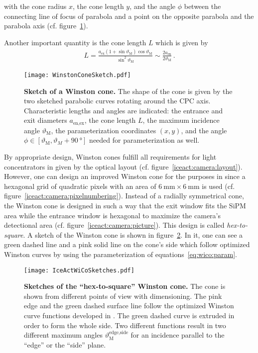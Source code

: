 with the cone radius $x$, the cone length $y$, and the angle $\phi$ between the connecting line of focus of parabola and a point on the opposite parabola and the parabola axis (cf. figure~\ref{iceact:camera:wico_sketch}).

Another important quantity is the cone length $L$ which is given by \cite{wico:book,iceact:camera}
\begin{align}
	L = \frac{a_\text{ex}(1+\sin\vartheta_\text{M})\cos\vartheta_\text{M}}{\sin^2\vartheta_\text{M}}\sim\frac{2a_\text{en}}{2\vartheta_\text{M}}\,.
\end{align}

\begin{figure}[H]
	\centering
	\texttt{[image: WinstonConeSketch.pdf]}
	\caption[Sketch of a Winston cone]{\textbf{Sketch of a Winston cone.} \cite{iceact:camera} The shape of the cone is given by the two sketched parabolic curves rotating around the CPC axis. Characteristic lengths and angles are indicated: the entrance and exit diameters $a_\text{en,ex}$, the cone length $L$, the maximum incidence angle $\vartheta_\text{M}$, the parameterization coordinates $(x,y)$, and the angle $\phi\in[\vartheta_\text{M},\vartheta_M+\SI{90}{\degree}]$ needed for parameterization as well.}
	\label{iceact:camera:wico_sketch}	
\end{figure}

By appropriate design, Winston cones fulfill all requirements for light concentrators in \iceact given by the optical layout (cf. figure~\ref{iceact:camera:layout}).
However, one can design an improved Winston cone for the purposes in \iceact since a hexagonal grid of quadratic pixels with an area of $\SI{6}{\milli\meter}\times\SI{6}{\milli\meter}$ is used (cf. figure~\ref{iceact:camera:pixelnumbering}). Instead of a radially symmetrical cone, the \iceact Winston cone is designed in such a way that the exit window fits the SiPM area while the entrance window is hexagonal to maximize the camera's detectional area (cf. figure~\ref{iceact:camera:picture}). This design is called \textit{hex-to-square}. A sketch of the \iceact Winston cone is shown in figure~\ref{iceact:camera:iceact_wico_sketch}. In it, one can see a green dashed line and a pink solid line on the cone's side which follow optimized Winston curves by using the parameterization of equations~\eqref{eq:wico:param}.

\begin{figure}[H]
	\centering
	\texttt{[image: IceActWiCoSketches.pdf]}
	\caption[Sketches of the \iceact \enquote{hex-to-square} Winston cone]{\textbf{Sketches of the \iceact \enquote{hex-to-square} Winston cone.} The cone is shown from different points of view with dimensioning. The pink edge and the green dashed surface line follow the optimized Winston curve functions developed in \cite{iceact:camera}. The green dashed curve is extruded in order to form the whole side. Two different functions result in two different maximum angles $\vartheta_\text{M}^\text{edge,side}$ for an incidence parallel to the \enquote{edge} or the \enquote{side} plane.}
	\label{iceact:camera:iceact_wico_sketch}	
\end{figure}

